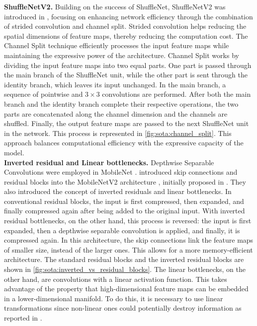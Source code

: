\noindent\textbf{ShuffleNetV2.} Building on the success of ShuffleNet, ShuffleNetV2 was introduced in
\cite{MaShuffleNetV2}, focusing on enhancing network efficiency through the
combination of strided convolution and channel split. Strided convolution helps
reducing the spatial dimensions of feature maps, thereby reducing the
computation cost. The Channel Split technique efficiently processes the input
feature maps while maintaining the expressive power of the architecture. Channel
Split works by dividing the input feature maps into two equal parts. One part is
passed through the main branch of the ShuffleNet unit, while the other part is
sent through the identity branch, which leaves its input unchanged. In the main
branch, a sequence of pointwise and $3\times 3$ convolutions are performed.
After both the main branch and the identity branch complete their respective
operations, the two parts are concatenated along the channel dimension and the
channels are shuffled. Finally, the output feature maps are passed to the next
ShuffleNet unit in the network. This process is represented in
\cref{fig:sota:channel_split}. This approach balances computational efficiency
with the expressive capacity of the model.\\

\noindent\textbf{Inverted residual and Linear bottlenecks.} Depthwise Separable
Convolutions were employed in MobileNet \cite{howard2017mobilenets}.
\citeauthor{DBLP:conf/cvpr/SandlerHZZC18} introduced skip connections and
residual blocks into the MobileNetV2 architecture
\cite{DBLP:conf/cvpr/SandlerHZZC18}, initially proposed in
\cite{DBLP:conf/cvpr/HeZRS16}. They also introduced the concept of inverted
residuals and linear bottlenecks. In conventional residual blocks, the input is
first compressed, then expanded, and finally compressed again after being added
to the original input. With inverted residual bottlenecks, on the other hand,
this process is reversed: the input is first expanded, then a depthwise
separable convolution is applied, and finally, it is compressed again. In this
architecture, the skip connections link the feature maps of smaller size,
instead of the larger ones. This allows for a more memory-efficient
architecture. The standard residual blocks and the inverted residual blocks are
shown in \cref{fig:sota:inverted_vs_residual_blocks}. The linear bottlenecks, on
the other hand, are convolutions with a linear activation function. This takes
advantage of the property that high-dimensional feature maps can be embedded in
a lower-dimensional manifold. To do this, it is necessary to use linear
transformations since non-linear ones could potentially destroy information as
reported in \cite{DBLP:conf/cvpr/SandlerHZZC18,DBLP:conf/cvpr/HanKK17}.\\

